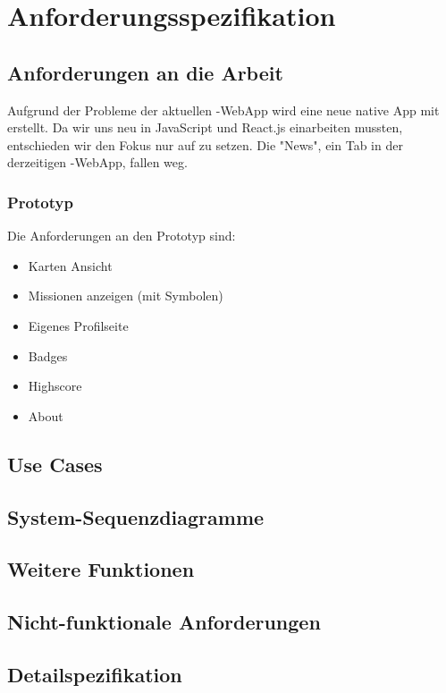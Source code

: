 \chapter{Anforderungsspezifikation}
\label{pd-anforderungsspezifikation}

\section{Anforderungen an die Arbeit} 
Aufgrund der Probleme der aktuellen \kort{}-\gls{WebApp} wird eine neue native App mit  erstellt. 
Da wir uns neu in JavaScript und React.js einarbeiten mussten, entschieden wir den Fokus nur auf  zu setzen.
Die "News", ein Tab in der derzeitigen \kort{}-\gls{WebApp}, fallen weg.


\subsection{Prototyp}
Die Anforderungen an den Prototyp sind: 

\begin{itemize}
	\item Karten Ansicht
	\item Missionen anzeigen (mit Symbolen)
	\item Eigenes Profilseite
	\item Badges
	\item Highscore
	\item About
\end{itemize}

\section{Use Cases}


\section{System-Sequenzdiagramme}


\section{Weitere Funktionen}


\section{Nicht-funktionale Anforderungen}


\section{Detailspezifikation}

